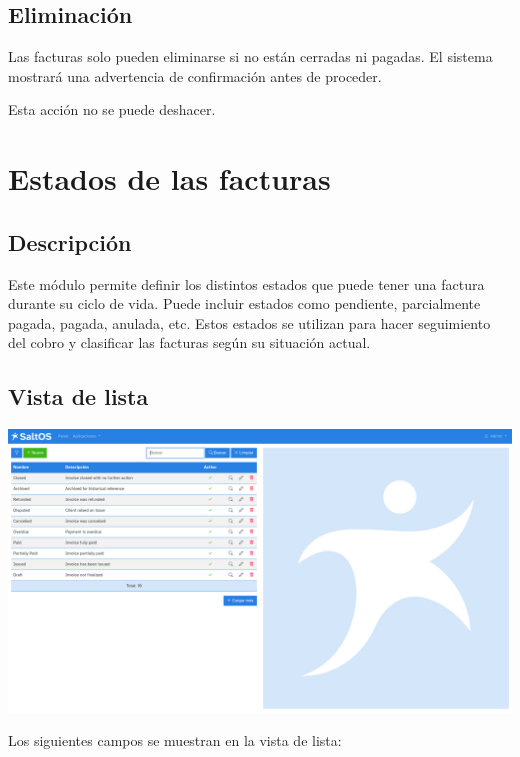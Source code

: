 \documentclass[a4paper]{article}
\begin{document}
\hypertarget{toc140}{}
\subsection{Eliminación}

Las facturas solo pueden eliminarse si no están cerradas ni pagadas.
El sistema mostrará una advertencia de confirmación antes de proceder.

Esta acción no se puede deshacer.


\hypertarget{toc141}{}
\section{Estados de las facturas}

\hypertarget{toc142}{}
\subsection{Descripción}

Este módulo permite definir los distintos estados que puede tener una factura durante su ciclo de vida.
Puede incluir estados como pendiente, parcialmente pagada, pagada, anulada, etc.
Estos estados se utilizan para hacer seguimiento del cobro y clasificar las facturas según su situación actual.

\hypertarget{toc143}{}
\subsection{Vista de lista}

\begin{center}\includegraphics[width=1\textwidth]{../ujest/snaps/test-screenshots-js-screenshots-sales-invoices-status-list-es-es-1-snap.png}\end{center}

Los siguientes campos se muestran en la vista de lista:
\end{document}
